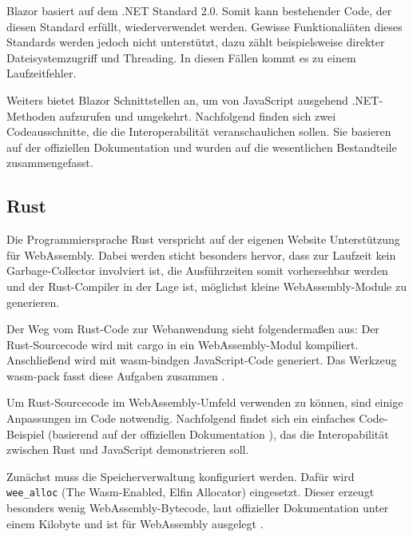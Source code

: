 Blazor basiert auf dem .NET Standard 2.0. Somit kann bestehender Code, der diesen Standard erfüllt, wiederverwendet werden. Gewisse Funktionaliäten dieses Standards werden jedoch nicht unterstützt, dazu zählt beispielsweise direkter Dateisystemzugriff und Threading. In diesen Fällen kommt es zu einem Laufzeitfehler.

Weiters bietet Blazor Schnittstellen an, um von JavaScript ausgehend .NET-Methoden aufzurufen und umgekehrt. Nachfolgend finden sich zwei Codeausschnitte, die die Interoperabilität veranschaulichen sollen. Sie basieren auf der offiziellen Dokumentation und wurden auf die wesentlichen Bestandteile zusammengefasst.





\subsection{Rust}

Die Programmiersprache Rust verspricht auf der eigenen Website \cite{RustWasmWebsite} Unterstützung für WebAssembly. Dabei werden sticht besonders hervor, dass zur Laufzeit kein Garbage-Collector involviert ist, die Ausführzeiten somit vorhersehbar werden und der Rust-Compiler in der Lage ist, möglichst kleine WebAssembly-Module zu generieren.

Der Weg vom Rust-Code zur Webanwendung sieht folgendermaßen aus: Der Rust-Sourcecode wird mit cargo in ein WebAssembly-Modul kompiliert. Anschließend wird mit wasm-bindgen JavaScript-Code generiert. Das Werkzeug wasm-pack fasst diese Aufgaben zusammen \cite{RustWasmBook}.

Um Rust-Sourcecode im WebAssembly-Umfeld verwenden zu können, sind einige Anpassungen im Code notwendig. Nachfolgend findet sich ein einfaches Code-Beispiel (basierend auf der offiziellen Dokumentation \cite{RustWasmBook}), das die Interopabilität zwischen Rust und JavaScript demonstrieren soll.



Zunächst muss die Speicherverwaltung konfiguriert werden. Dafür wird \lstinline{wee_alloc} (The Wasm-Enabled, Elfin Allocator) eingesetzt. Dieser erzeugt besonders wenig WebAs\-sembly-Bytecode, laut offizieller Dokumentation unter einem Kilobyte und ist für WebAssembly ausgelegt \cite{WeeAlloc}.

